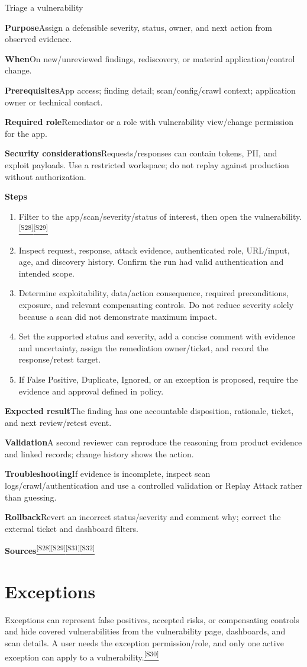 \documentclass[11pt,letterpaper,oneside]{scrreprt}
\newcommand{\src}[1]{\hyperref[src:#1]{\textsuperscript{\color{R7Orange}[#1]}}}
\newcommand{\field}[1]{\par\smallskip\noindent\textbf{#1}\quad}
\begin{document}
\begin{procedure}{Triage a vulnerability}
\field{Purpose}Assign a defensible severity, status, owner, and next action from observed evidence.
\field{When}On new/unreviewed findings, rediscovery, or material application/control change.
\field{Prerequisites}App access; finding detail; scan/config/crawl context; application owner or technical contact.
\field{Required role}Remediator or a role with vulnerability view/change permission for the app.
\field{Security considerations}Requests/responses can contain tokens, PII, and exploit payloads. Use a restricted workspace; do not replay against production without authorization.
\field{Steps}
\begin{enumerate}
  \item Filter to the app/scan/severity/status of interest, then open the vulnerability.\src{S28}\src{S29}
  \item Inspect request, response, attack evidence, authenticated role, URL/input, age, and discovery history. Confirm the run had valid authentication and intended scope.
  \item Determine exploitability, data/action consequence, required preconditions, exposure, and relevant compensating controls. Do not reduce severity solely because a scan did not demonstrate maximum impact.
  \item Set the supported status and severity, add a concise comment with evidence and uncertainty, assign the remediation owner/ticket, and record the response/retest target.
  \item If False Positive, Duplicate, Ignored, or an exception is proposed, require the evidence and approval defined in policy.
\end{enumerate}
\field{Expected result}The finding has one accountable disposition, rationale, ticket, and next review/retest event.
\field{Validation}A second reviewer can reproduce the reasoning from product evidence and linked records; change history shows the action.
\field{Troubleshooting}If evidence is incomplete, inspect scan logs/crawl/authentication and use a controlled validation or Replay Attack rather than guessing.
\field{Rollback}Revert an incorrect status/severity and comment why; correct the external ticket and dashboard filters.
\field{Sources}\src{S28}\src{S29}\src{S31}\src{S32}
\end{procedure}

\section{Exceptions}
Exceptions can represent false positives, accepted risks, or compensating controls and hide covered vulnerabilities from the vulnerability page, dashboards, and scan details. A user needs the exception permission/role, and only one active exception can apply to a vulnerability.\src{S30}
\end{document}
